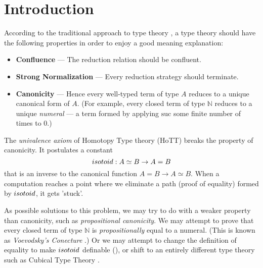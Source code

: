 \usepackage{amsmath}
\usepackage{amssymb}
\usepackage{autofe}
\usepackage{bbm}
\usepackage[greek,english]{babel}
\usepackage{etex}
\usepackage{framed}
\usepackage[utf8x]{inputenc}
\usepackage{proof}
\usepackage{stmaryrd}
\usepackage{suffix}
\usepackage{textalpha}
\usepackage{todo}
\usepackage{ucs}



\newcommand{\AgdaHide}[1]{}



\maketitle

\section{Introduction}

According to the traditional approach to type theory , a type theory should have the
following properties in order to enjoy a good meaning explanation:
\begin{itemize}
\item \textbf{Confluence} --- The reduction relation should be confluent.
\item \textbf{Strong Normalization} --- Every reduction strategy should terminate.
\item \textbf{Canonicity} --- Hence every well-typed term of type $A$ reduces to a unique canonical form of $A$.  (For example,
every closed term of type $\mathbb{N}$ reduces to a unique \emph{numeral} --- a term formed by applying $\mathrm{suc}$ some
finite number of times to 0.)
\end{itemize}

The \emph{univalence axiom} of Homotopy Type theory (HoTT)  breaks the property of canonicity.  It postulates a
constant
\[ isotoid : A \simeq B \rightarrow A = B \]
that is an inverse to the canonical function $A = B \rightarrow A \simeq B$.  When a computation reaches a point
where we eliminate a path (proof of equality) formed by $isotoid$, it gets 'stuck'.

As possible solutions to this problem, we may try to do with a weaker property than canonicity, such as \emph{propositional canonicity}.
We may attempt to prove that every closed term of type $\mathbb{N}$ is \emph{propositionally} equal to a numeral.  (This is known as
\emph{Voevodsky's Conecture} .)  Or we may attempt to change the definition of equality to make $isotoid$ definable (\cite{Polonsky14a}), or
shift to an entirely different type theory such as Cubical Type Theory .

